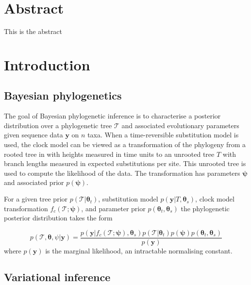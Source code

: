 \documentclass{article}
\begin{document}
\section*{Abstract}
This is the abstract

\section*{Introduction}

\subsection*{Bayesian phylogenetics}

The goal of Bayesian phylogenetic inference is to characterise a posterior distribution over a phylogenetic tree $\mathcal{T}$ and associated evolutionary parameters given sequence data $\mathbf{y}$ on $n$ taxa.
When a time-reversible substitution model is used, the clock model can be viewed as a transformation of the phylogeny from a rooted tree in with heights measured in time units to an unrooted tree $T$ with branch lengths measured in expected substitutions per site. This unrooted tree is used to compute the likelihood of the data. The transformation has parameters $\bm{\psi}$ and associated prior $p(\bm{\psi})$.

For a given tree prior $p(\mathcal{T} | \bm{\theta}_t)$, substitution model $p(\mathbf{y} | T,\bm{\theta}_s)$, clock model transformation $f_c(\mathcal{T} ; \bm{\psi})$, and parameter prior $p(\bm{\theta}_t, \bm{\theta}_s)$ the phylogenetic posterior distribution takes the form

\begin{equation*}
p(\mathcal{T},\bm{\theta},\psi|\mathbf{y}) = \frac{p(\mathbf{y} | f_c(\mathcal{T} ; \bm{\psi}), \bm{\theta}_s)p(\mathcal{T}|\bm{\theta}_t)p(\bm{\psi})p(\bm{\theta}_t, \bm{\theta}_s)}{p(\mathbf{y})}
\end{equation*}
where $p(\mathbf{y})$ is the marginal likelihood, an intractable normalising constant.



\subsection*{Variational inference}
\end{document}
